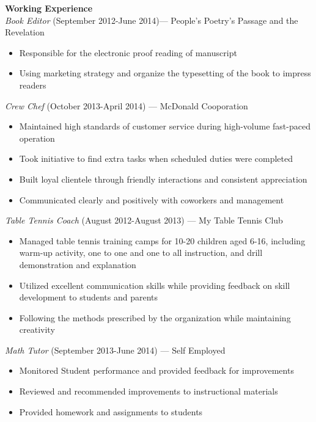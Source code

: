 \documentclass[12pt,a4paper]{article}
\begin{document}
\begin{flushleft}
\textbf{Working Experience}\\
\textit{Book Editor} (September 2012-June 2014)--- People’s Poetry’s Passage and the Revelation
\begin{itemize}
\item Responsible for the electronic proof reading of manuscript
\item Using marketing strategy and organize the typesetting of the book to impress readers
\end{itemize}
\textit{Crew Chef}  (October 2013-April 2014) --- McDonald Cooporation
\begin{itemize}
\item Maintained high standards of customer service during high-volume fast-paced operation
\item Took initiative to find extra tasks when scheduled duties were completed 
\item Built loyal clientele through friendly interactions and consistent appreciation
\item Communicated clearly and positively with coworkers and management
\end{itemize}
\textit{Table Tennis Coach} (August 2012-August 2013) --- My Table Tennis Club
\begin{itemize}
\item Managed table tennis training camps for 10-20 children aged 6-16, including warm-up activity, one to one and one to all instruction, and drill demonstration and explanation
\item Utilized excellent communication skills while providing feedback on skill development to students and parents
\item Following the methods prescribed by the organization while maintaining creativity
\end{itemize}
\textit{Math Tutor} (September 2013-June 2014) --- Self Employed
\begin{itemize}
\item Monitored Student performance and provided feedback for improvements
\item Reviewed and recommended improvements to instructional materials
\item Provided homework and assignments to students 
\end{itemize}
\end{flushleft}
\end{document}
